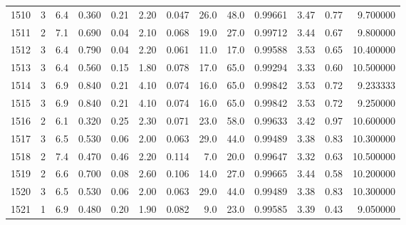 \begin{tabular}{lrrrrrrrrrrrr}
1510 &        3 &            6.4 &             0.360 &         0.21 &            2.20 &      0.047 &                 26.0 &                  48.0 &  0.99661 &  3.47 &       0.77 &   9.700000 \\
1511 &        2 &            7.1 &             0.690 &         0.04 &            2.10 &      0.068 &                 19.0 &                  27.0 &  0.99712 &  3.44 &       0.67 &   9.800000 \\
1512 &        3 &            6.4 &             0.790 &         0.04 &            2.20 &      0.061 &                 11.0 &                  17.0 &  0.99588 &  3.53 &       0.65 &  10.400000 \\
1513 &        3 &            6.4 &             0.560 &         0.15 &            1.80 &      0.078 &                 17.0 &                  65.0 &  0.99294 &  3.33 &       0.60 &  10.500000 \\
1514 &        3 &            6.9 &             0.840 &         0.21 &            4.10 &      0.074 &                 16.0 &                  65.0 &  0.99842 &  3.53 &       0.72 &   9.233333 \\
1515 &        3 &            6.9 &             0.840 &         0.21 &            4.10 &      0.074 &                 16.0 &                  65.0 &  0.99842 &  3.53 &       0.72 &   9.250000 \\
1516 &        2 &            6.1 &             0.320 &         0.25 &            2.30 &      0.071 &                 23.0 &                  58.0 &  0.99633 &  3.42 &       0.97 &  10.600000 \\
1517 &        3 &            6.5 &             0.530 &         0.06 &            2.00 &      0.063 &                 29.0 &                  44.0 &  0.99489 &  3.38 &       0.83 &  10.300000 \\
1518 &        2 &            7.4 &             0.470 &         0.46 &            2.20 &      0.114 &                  7.0 &                  20.0 &  0.99647 &  3.32 &       0.63 &  10.500000 \\
1519 &        2 &            6.6 &             0.700 &         0.08 &            2.60 &      0.106 &                 14.0 &                  27.0 &  0.99665 &  3.44 &       0.58 &  10.200000 \\
1520 &        3 &            6.5 &             0.530 &         0.06 &            2.00 &      0.063 &                 29.0 &                  44.0 &  0.99489 &  3.38 &       0.83 &  10.300000 \\
1521 &        1 &            6.9 &             0.480 &         0.20 &            1.90 &      0.082 &                  9.0 &                  23.0 &  0.99585 &  3.39 &       0.43 &   9.050000 \\

\end{tabular}
